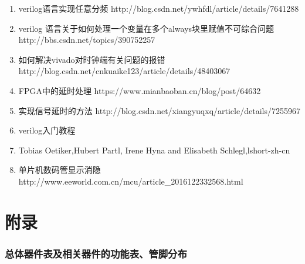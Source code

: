 \documentclass[a4paper,11pt]{ctexart}
\begin{document}
\begin{enumerate}
  \item verilog语言实现任意分频 http://blog.csdn.net/ywhfdl/article/details/7641288
  \item verilog 语言关于如何处理一个变量在多个always块里赋值不可综合问题 http://bbs.csdn.net/topics/390752257
  \item 如何解决vivado对时钟端有关问题的报错 http://blog.csdn.net/cnkuaike123/article/details/48403067
  \item FPGA中的延时处理 https://www.mianbaoban.cn/blog/post/64632
  \item 实现信号延时的方法 http://blog.csdn.net/xiangyuqxq/article/details/7255967
  \item verilog入门教程
  \item Tobias Oetiker,Hubert Partl, Irene Hyna and Elisabeth Schlegl,lshort-zh-cn
  \item 单片机数码管显示消隐 http://www.eeworld.com.cn/mcu/article\_2016122332568.html
\end{enumerate}

\newpage
\appendix
\part{附录}
\section{总体器件表及相关器件的功能表、管脚分布}
\end{document}
